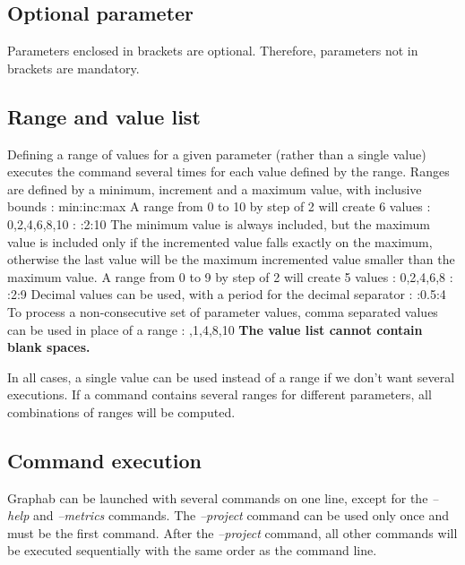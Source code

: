 \documentclass[a4paper,10pt]{report}
\newenvironment{cmd}
{\quote\Verbatim}
{\endVerbatim\endquote}
\begin{document}
\subsection{Optional parameter}
Parameters enclosed in brackets are optional. 
Therefore, parameters not in brackets are mandatory.
\subsection{Range and value list}
Defining a range of values for a given parameter (rather than a single value) executes the command several times for each value defined by the range.
Ranges are defined by a minimum, increment and a maximum value, with inclusive bounds :
\begin{cmd}
min:inc:max
\end{cmd}
A range from 0 to 10 by step of 2 will create 6 values : 0,2,4,6,8,10 :
\begin{cmd}
0:2:10
\end{cmd}
The minimum value is always included, but the maximum value is included only if the incremented value falls exactly on the maximum, 
otherwise the last value will be the maximum incremented value smaller than the maximum value.
A range from 0 to 9 by step of 2 will create 5 values : 0,2,4,6,8 :
\begin{cmd}
0:2:9
\end{cmd}
Decimal values can be used, with a period for the decimal separator : 
\begin{cmd}
1.5:0.5:4
\end{cmd}
To process a non-consecutive set of parameter values, comma separated values can be used in place of a range :
\begin{cmd}
0,1,4,8,10
\end{cmd}
\textbf{The value list cannot contain blank spaces.}

In all cases, a single value can be used instead of a range if we don't want several executions.
If a command contains several ranges for different parameters, all combinations of ranges will be computed.

\subsection{Command execution}
Graphab can be launched with several commands on one line, except for the \textit{--help} and \textit{--metrics} commands.
The \textit{--project} command can be used only once and must be the first command. 
After the \textit{--project} command, all other commands will be executed sequentially with the same order as the command line.
\end{document}
